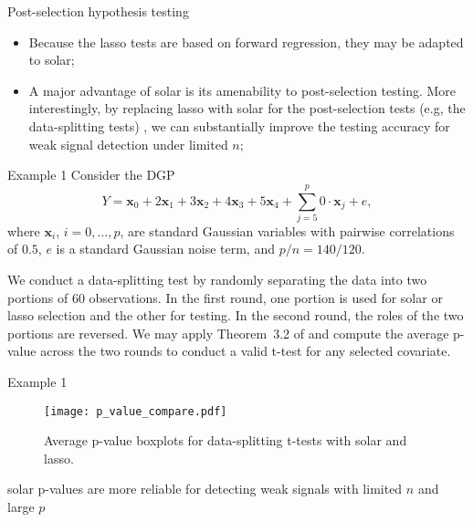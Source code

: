 \documentclass{beamer}
\begin{document}
\begin{frame}{Post-selection hypothesis testing}
  \begin{itemize}
    \item Because the lasso tests \citep{lockhartall14, taylor2014exact} are based on forward regression, they may be adapted to solar;
    \item A major advantage of solar is its amenability to post-selection testing. More interestingly, by replacing lasso with solar for the post-selection tests (e.g, the data-splitting tests) \citep{wasserman2009high,meinshausen2009p}, we can substantially improve the testing accuracy for weak signal detection under limited $n$;
  \end{itemize}
\end{frame}

\begin{frame}{Example 1}
  Consider the DGP
  \begin{equation}
    Y = \mathbf{x}_0 + 2 \mathbf{x}_1 + 3 \mathbf{x}_2 + 4 \mathbf{x}_3 + 5 \mathbf{x}_4 + \sum_{j=5}^{p} 0 \cdot \mathbf{x}_j + e,
  \end{equation}
  where $\mathbf{x}_i$, $i=0,\dots,p$, are standard Gaussian variables with pairwise correlations of $0.5$, $e$ is a standard Gaussian noise term, and $p/n=140/120$.
  
  We conduct a data-splitting test \citep{romano2019multiple,diciccio2020exact} by randomly separating the data into two portions of 60 observations. In the first round, one portion is used for solar or lasso selection and the other for testing. In the second round, the roles of the two portions are reversed. We may apply Theorem~3.2 of \citet{romano2019multiple} and compute the average p-value across the two rounds to conduct a valid t-test for any selected covariate.
\end{frame}

\begin{frame}{Example 1}
  \begin{figure}[ht]
      \centering
      \texttt{[image: p\_value\_compare.pdf]}
      \caption{Average p-value boxplots for data-splitting t-tests with solar and lasso.}
      \label{fig:p_value_compare}
  \end{figure}
  solar p-values are more reliable for detecting weak signals with limited $n$ and large $p$
\end{frame}
\end{document}
